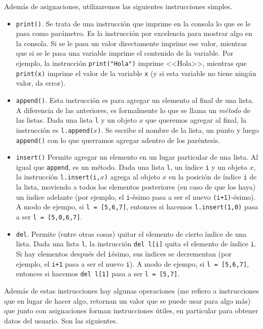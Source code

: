 \documentclass[a4paper, 12pt]{report}
\theoremstyle{definition}
\begin{document}
Además de asignaciones, utilizaremos las siguientes instrucciones simples.
\begin{itemize}
	\item {\tt print()}. Se trata de una instrucción que imprime en la consola lo que se le pasa como parámetro. Es la instrucción por excelencia para mostrar algo en la consola. Si se le pasa un valor directamente imprime ese valor, mientras que si se le pasa una variable imprime el contenido de la variable. Por ejemplo, la instrucción {\tt print("Hola")} imprime <<Hola>>, mientras que {\tt print(x)} imprime el valor de la variable {\tt x} (y si esta variable no tiene ningún valor, da error).
	
	\item {\tt append()}. Esta instrucción es para agregar un elemento al final de una lista. A diferencia de las anteriores, es formalmente lo que se llama un {\sl método} de las listas. Dada una lista {\tt l} y un objeto $x$ que queremos agregar al final, la instrucción es {\tt l.append($x$)}. Se escribe el nombre de la lista, un punto y luego {\tt append()} con lo que querramos agregar adentro de los paréntesis.
	
	\item {\tt insert()} Permite agregar un elemento en un lugar particular de una lista. Al igual que {\tt append}, es un método. Dada una lista {\tt l}, un índice {\tt i} y un objeto $x$, la instrucción {\tt l.insert(i,$x$)} agrega al objeto $x$ en la posición de índice {\tt i} de la lista, moviendo a todos los elementos posteriores (en caso de que los haya) un índice adelante (por ejemplo, el {\tt i}-ésimo pasa a ser el nuevo {\tt(i+1)}-ésimo). A modo de ejempo, si {\tt l = [5,6,7]}, entonces si hacemos {\tt l.insert(1,0)} pasa a ser {\tt l = [5,0,6,7]}.
	
	\item {\tt del}. Permite (entre otras cosas) quitar el elemento de cierto índice de una lista. Dada una lista {\tt l}, la instrucción {\tt del l[i]} quita el elemento de índice {\tt i}. Si hay elementos después del {\tt i}ésimo, sus índices se decrementan (por ejemplo, el {\tt i+1} pasa a ser el nuevo {\tt i}). A modo de ejempo, si {\tt l = [5,6,7]}, entonces si hacemos {\tt del~l[1]} pasa a ser {\tt l = [5,7]}.
\end{itemize}

Además de estas instrucciones hay algunas operaciones (me refiero a instrucciones que en lugar de hacer algo, retornan un valor que se puede usar para algo más) que junto con asignaciones forman instrucciones útiles, en particular para obtener datos del usuario. Son las siguientes.
\end{document}
